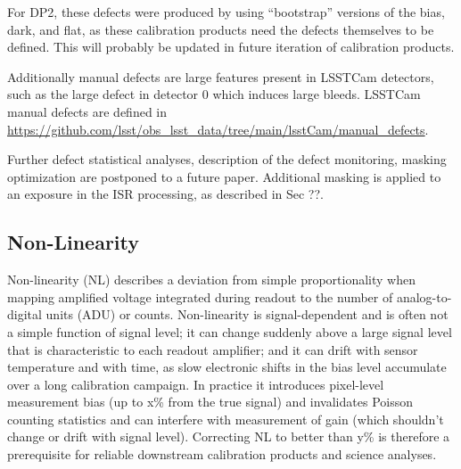 For DP2, these defects were produced by using ``bootstrap'' versions of the bias, dark, and flat, as these calibration products need the defects themselves to be defined.
This will probably be updated in future iteration of calibration products.

Additionally manual defects are large features present in LSSTCam detectors, such as the large defect in detector 0
which induces large bleeds. LSSTCam manual defects are defined in \url{https://github.com/lsst/obs_lsst_data/tree/main/lsstCam/manual_defects}.

Further defect statistical analyses, description of the defect monitoring, masking optimization are postponed to a future paper.
Additional masking is applied to an exposure in the ISR processing, as described in Sec ??.

\subsection{Non-Linearity} \label{sec:processing:calibration:linearity}

Non-linearity (NL) describes a deviation from simple proportionality when mapping amplified voltage integrated during readout to the number of analog-to-digital units (ADU) or counts.
Non-linearity is signal-dependent and is often not a simple function of signal level; it can change suddenly above a large signal level that is characteristic to each readout amplifier; and it can drift with sensor temperature and with time, as slow electronic shifts in the bias level accumulate over a long calibration campaign.
In practice it introduces pixel-level measurement bias (up to x\% from the true signal) and invalidates Poisson counting statistics and can interfere with measurement of gain (which shouldn't change or drift with signal level).
Correcting NL to better than y\% is therefore a prerequisite for reliable downstream calibration products and science analyses.

